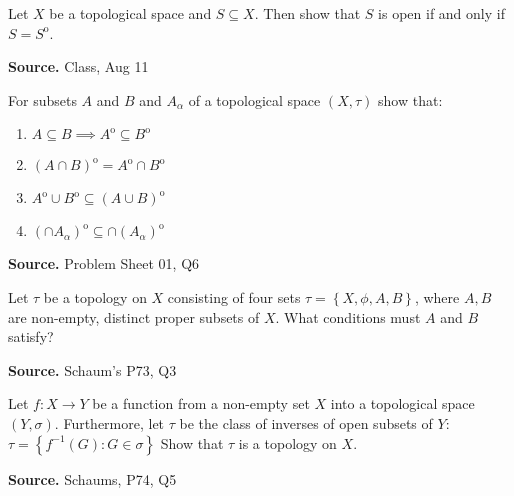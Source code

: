 \documentclass[12pt,twoside]{report}
\newenvironment*{source}{\hfill\scriptsize\textbf{Source.}\space}{\par}
\begin{document}
\begin{samepage}
\begin{ex}
Let $X$ be a topological space and $S \subseteq X$. Then show that $S$ is open if and only if $S = S ^\mathrm{o}$.
\end{ex}
\begin{source}
Class, Aug 11
\end{source}
\end{samepage}

\begin{samepage}
\begin{ex}
    For subsets $A$ and $B$ and $A_\alpha$ of a topological space $\left (X, \tau\right )$ show that:
    \begin{enumerate}
        \item $A \subseteq B \implies A ^\mathrm{o} \subseteq B ^\mathrm{o}$
        \item $\left (A \cap B\right ) ^\mathrm{o} = A ^\mathrm{o} \cap B ^\mathrm{o}$
        \item $A ^\mathrm{o} \cup B ^\mathrm{o} \subseteq \left (A \cup B\right ) ^\mathrm{o}$
        \item $\left (\cap A_\alpha\right ) ^\mathrm{o} \subseteq \cap \left (A_\alpha\right ) ^\mathrm{o}$
    \end{enumerate}
\end{ex}
\begin{source}
    Problem Sheet 01, Q6
\end{source}
\end{samepage}


\begin{samepage}
\begin{ex}
Let $\tau$ be a topology on $X$ consisting of four sets $ \tau = \left\{ X, \phi, A, B \right\} $, where $A, B$ are non-empty, distinct proper subsets of $X$.
What conditions must $A$ and $B$ satisfy?
\end{ex}
\begin{source}
Schaum's P73, Q3
\end{source}
\end{samepage}

\begin{samepage}
\begin{ex}
Let $f \colon X \to Y$ be a function from a non-empty set $X$ into a topological space $\left (Y, \sigma\right )$.
Furthermore, let $\tau$ be the class of inverses of open subsets of $Y$:
$\tau = \left\{ f^{-1} \left (G\right )  :  G \in \sigma \right\} $
Show that $\tau$ is a topology on $X$.
\end{ex}
\begin{source}
Schaums, P74, Q5
\end{source}
\end{samepage}
\end{document}

